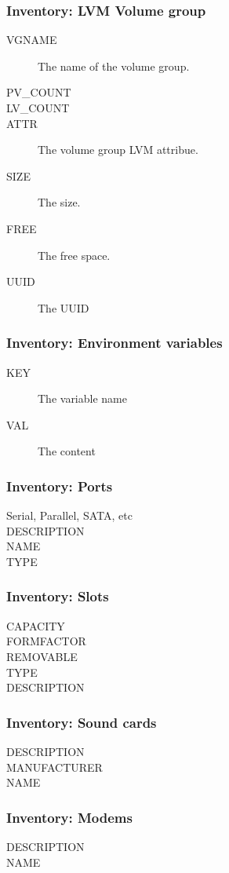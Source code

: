 \documentclass{beamer}
\begin{document}
\begin{frame}
\frametitle{Inventory: LVM Volume group}
\begin{description}
      \item[VGNAME] The name of the volume group.
      \item[PV\_COUNT]
      \item[LV\_COUNT]
      \item[ATTR] The volume group LVM attribue.
      \item[SIZE] The size.
      \item[FREE] The free space.
      \item[UUID] The UUID
\end{description}
\end{frame}
\begin{frame}
\frametitle{Inventory: Environment variables}
\begin{description}
      \item[KEY] The variable name
      \item[VAL] The content
\end{description}
\end{frame}


\begin{frame}
\frametitle{Inventory: Ports}
\begin{description}
      \item[Serial, Parallel, SATA, etc]
      \item[DESCRIPTION]
      \item[NAME]
      \item[TYPE]
\end{description}
\end{frame}

\begin{frame}
\frametitle{Inventory: Slots}
\begin{description}
      \item[CAPACITY]
      \item[FORMFACTOR]
      \item[REMOVABLE]
      \item[TYPE]
      \item[DESCRIPTION]
\end{description}
\end{frame}
\begin{frame}
\frametitle{Inventory: Sound cards}
\begin{description}
      \item[DESCRIPTION]
      \item[MANUFACTURER]
      \item[NAME]
\end{description}
\end{frame}
\begin{frame}
\frametitle{Inventory: Modems}
\begin{description}
      \item[DESCRIPTION]
      \item[NAME]
\end{description}
\end{frame}
\end{document}
